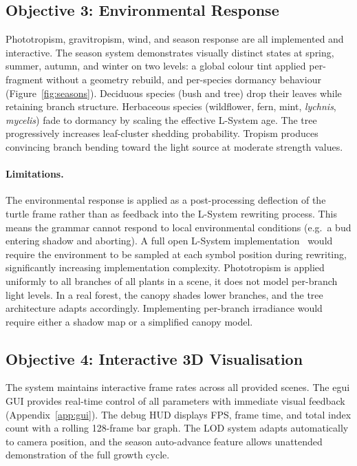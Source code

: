 \subsection{Objective 3: Environmental Response}

Phototropism, gravitropism, wind, and season response are all implemented and interactive. The season system
demonstrates visually distinct states at spring, summer, autumn, and winter on two levels: a global colour
tint applied per-fragment without a geometry rebuild, and per-species dormancy behaviour
(Figure~\ref{fig:seasons}). Deciduous species (bush and tree) drop their leaves while retaining branch structure.
Herbaceous species (wildflower, fern, mint, \textit{lychnis}, \textit{mycelis}) fade to dormancy by scaling
the effective L-System age. The tree progressively increases leaf-cluster shedding probability. Tropism
produces convincing branch bending toward the light source at moderate strength values.

\paragraph{Limitations.}
The environmental response is applied as a post-processing deflection of the turtle frame rather than as
feedback into the L-System rewriting process. This means the grammar cannot respond to local environmental
conditions (e.g.\ a bud entering shadow and aborting). A full open L-System
implementation~\cite{mechVisualModelsPlants1996} would require the environment to be sampled at each symbol
position during rewriting, significantly increasing implementation complexity. Phototropism is applied
uniformly to all branches of all plants in a scene, it does not model per-branch light levels. In a real
forest, the canopy shades lower branches, and the tree architecture adapts accordingly. Implementing
per-branch irradiance would require either a shadow map or a simplified canopy model.

\subsection{Objective 4: Interactive 3D Visualisation}

The system maintains interactive frame rates across all provided scenes. The egui GUI provides real-time
control of all parameters with immediate visual feedback (Appendix~\ref{app:gui}). The debug HUD displays
FPS, frame time, and total index count with a rolling 128-frame bar graph. The LOD system adapts
automatically to camera position, and the season auto-advance feature allows unattended demonstration of the
full growth cycle.

